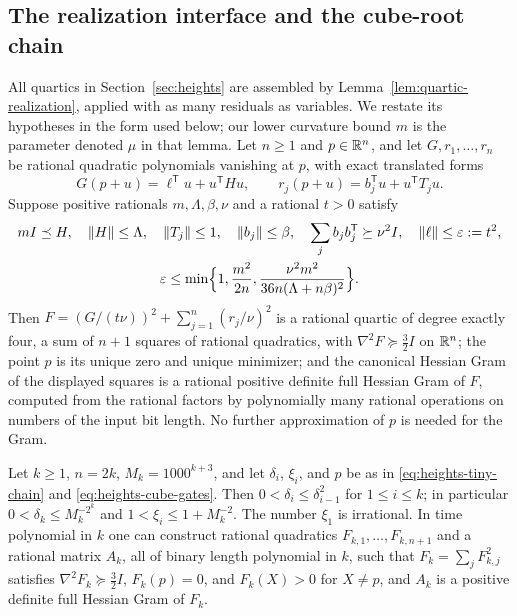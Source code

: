 \subsection{The realization interface and the cube-root chain}
\label{app:heights-cube}

All quartics in Section~\ref{sec:heights} are assembled by
Lemma~\ref{lem:quartic-realization}, applied with as many residuals as
variables. We restate its hypotheses in the form used below; our lower
curvature bound $m$ is the parameter denoted $\mu$ in that lemma. Let $n\ge1$
and $p\in\mathbb R^n$, and let $G,r_1,\ldots,r_n$ be rational quadratic polynomials
vanishing at $p$, with exact translated forms
\[
 G(p+u)=\ell^{\mathsf T}u+u^{\mathsf T}Hu,\qquad
 r_j(p+u)=b_j^{\mathsf T}u+u^{\mathsf T}T_ju .
\]
Suppose positive rationals $m,\Lambda,\beta,\nu$ and a rational $t>0$ satisfy
\begin{gather}
 mI\preceq H,\quad \left\lVert H\right\rVert\le\Lambda,\quad \left\lVert T_j\right\rVert\le1,\quad
 \left\lVert b_j\right\rVert\le\beta,\quad \sum_jb_jb_j^{\mathsf T}\succeq\nu^2I,\quad
 \left\lVert\ell\right\rVert\le\varepsilon:=t^2,
 \label{eq:heights-R1}\\
 \varepsilon\le\min\Bigl\{1,\frac{m^2}{2n},
   \frac{\nu^2m^2}{36n(\Lambda+n\beta)^2}\Bigr\}.
 \label{eq:heights-R2}
\end{gather}
Then $F=(G/(t\nu))^2+\sum_{j=1}^n(r_j/\nu)^2$ is a rational quartic of
degree exactly four, a sum of $n+1$ squares of rational quadratics, with
$\nabla^2F\succeq\frac32I$ on $\mathbb R^n$; the point $p$ is its unique zero and
unique minimizer; and the canonical Hessian Gram of the displayed squares is a
rational positive definite full Hessian Gram of $F$, computed from the
rational factors by polynomially many rational operations on numbers of the
input bit length. No further approximation of $p$ is needed for the Gram.

\begin{lemma}
\label{lem:heights-cube-chain}
Let $k\ge1$, $n=2k$, $M_k=1000^{k+3}$, and let $\delta_i$, $\xi_i$, and $p$ be
as in \eqref{eq:heights-tiny-chain} and \eqref{eq:heights-cube-gates}.
Then $0<\delta_i\le\delta_{i-1}^2$ for $1\le i\le k$; in particular
$0<\delta_k\le M_k^{-2^k}$ and $1<\xi_i\le1+M_k^{-2}$. The number $\xi_1$ is
irrational. In time polynomial in $k$ one can construct rational quadratics
$F_{k,1},\ldots,F_{k,n+1}$ and a rational matrix $A_k$, all of binary length
polynomial in $k$, such that $F_k=\sum_jF_{k,j}^2$ satisfies
$\nabla^2F_k\succeq\frac32I$, $F_k(p)=0$, and $F_k(X)>0$ for $X\ne p$, and
$A_k$ is a positive definite full Hessian Gram of $F_k$.
\end{lemma}

